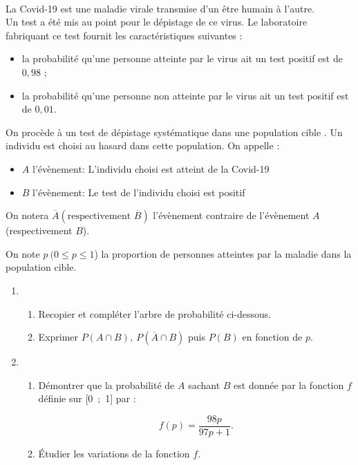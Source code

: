 \documentclass[12pt,fleqn]{report} %
\begin{document}
\begin{exercise}\label{Exercice 59}\text{ }\\
	La Covid-19 est une maladie virale transmise d'un être humain à l'autre.\\
	Un test a été mis au point pour le dépistage de ce virus. Le laboratoire fabriquant ce test fournit les caractéristiques suivantes :
	
	\setlength\parindent{8mm}
	\begin{itemize}
		\item la probabilité qu'une personne atteinte par le virus ait un test positif est de $0,98$ ;
		\item la probabilité qu'une personne non atteinte par le virus ait un test positif est de $0,01$.
	\end{itemize}
	\setlength\parindent{0mm}
	
	\smallskip
	
	On procède à un test de dépistage systématique dans une population \og cible \fg. Un individu est choisi au hasard dans cette population. On appelle :
	
	\setlength\parindent{8mm}
	\begin{itemize}
		\item $A$ l'évènement: \og L'individu choisi est atteint de la Covid-19 \fg
		\item $B$ l'évènement: \og Le test de l'individu choisi est positif \fg
	\end{itemize}
	\setlength\parindent{0mm}
	
	On notera $\overline{A} \left(\text{respectivement } \overline{B}\right)$ l'évènement contraire de l'évènement $A$ (respectivement $B$).
	
	On note $p\: (0 \leqslant  p \leqslant 1$) la proportion de personnes atteintes par la maladie dans la population cible.
	
	\medskip
	
	\begin{enumerate}
		\item 
		\begin{enumerate}
			\item Recopier et compléter l'arbre de probabilité ci-dessous.
			
			\ArbreProba{}{}{}
			
			
			\item Exprimer $P(A \cap B),\: P\left(\overline{A} \cap B\right)$ puis $P(B)$ en fonction de $p$.
		\end{enumerate}
		\item 
		\begin{enumerate}
			\item Démontrer que la probabilité de $A$ sachant $B$ est donnée par la fonction $f$ définie sur [0~;~1] par : 
			
			\[f(p) = \dfrac{98p}{97p+1}.\]
			
			\item Étudier les variations de la fonction $f$.
		\end{enumerate}
	\end{enumerate}
\end{exercise}
\end{document}
